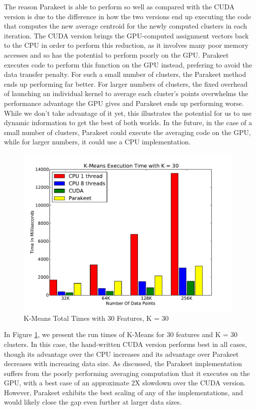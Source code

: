 \documentclass[10pt,twocolumn]{article}
\begin{document}
The reason Parakeet is able to perform so well as compared with the CUDA version is due to the difference in how the two versions end up executing the code that computes the new average centroid for the newly computed clusters in each iteration.  The CUDA version brings the GPU-computed assignment vectors back to the CPU in order to perform this reduction, as it involves many poor memory accesses and so has the potential to perform poorly on the GPU.  Parakeet executes code to perform this function on the GPU instead, prefering to avoid the data transfer penalty.  For such a small number of clusters, the Parakeet method ends up performing far better.  For larger numbers of clusters, the fixed overhead of launching an individual kernel to average each cluster's points overwhelms the performance advantage the GPU gives and Parakeet ends up performing worse. While we don't take advantage of it yet, this illustrates the potential for us to use dynamic information to get the best of both worlds.  In the future, in the case of a small number of clusters, Parakeet could execute the averaging code on the GPU, while for larger numbers, it could use a CPU implementation.

\begin{figure}
\includegraphics[scale=0.45]{KMCPUK30.pdf}
\caption{K-Means Total Times with 30 Features, K = 30}
\label{KMCPU30}
\end{figure}

In Figure \ref{KMCPU30}, we present the run times of K-Means for 30 features and K = 30 clusters.  In this case, the hand-written CUDA version performs best in all cases, though its advantage over the CPU increases and its advantage over Parakeet decreases with increasing data size.  As discussed, the Parakeet implementation suffers from the poorly performing averaging computation that it executes on the GPU, with a best case of an approximate 2X slowdown over the CUDA version.  However, Parakeet exhibits the best scaling of any of the implementations, and would likely close the gap even further at larger data sizes.
\end{document}

